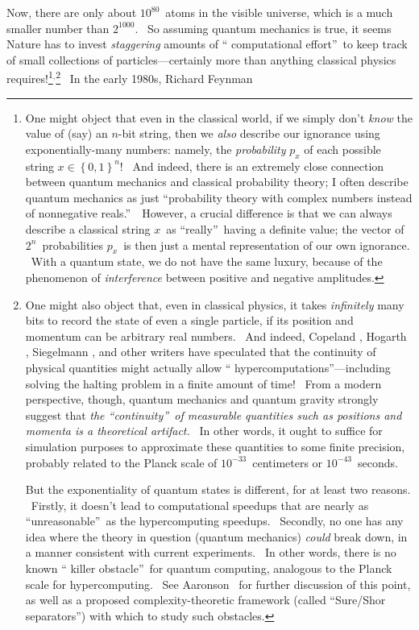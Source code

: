 \documentclass[11pt,onecolumn]{article}%
\begin{document}
Now, there are only about $10^{80}$\ atoms in the visible universe, which is a
much smaller number than $2^{1000}$. \ So assuming quantum mechanics is true,
it seems Nature has to invest \textit{staggering} amounts of \textquotedblleft
computational effort\textquotedblright\ to keep track of small collections of
particles---certainly more than anything classical physics
requires!\footnote{One might object that even in the classical world, if we
simply don't \textit{know} the value of (say) an $n$-bit string, then we
\textit{also} describe our ignorance using exponentially-many numbers: namely,
the \textit{probability} $p_{x}$ of each possible string $x\in\left\{
0,1\right\}  ^{n}$! \ And indeed, there is an extremely close connection
between quantum mechanics and classical probability theory; I often describe
quantum mechanics as just \textquotedblleft probability theory with complex
numbers instead of nonnegative reals.\textquotedblright\ \ However, a crucial
difference is that we can always describe a classical string $x$\ as
\textquotedblleft really\textquotedblright\ having a definite value; the
vector of $2^{n}$\ probabilities $p_{x}$\ is then just a mental representation
of our own ignorance. \ With a quantum state, we do not have the same luxury,
because of the phenomenon of \textit{interference} between positive and
negative amplitudes.}$^{,}$\footnote{One might also object that, even in
classical physics, it takes \textit{infinitely} many bits to record the state
of even a single particle, if its position and momentum can be arbitrary real
numbers. \ And indeed, Copeland \cite{copeland}, Hogarth \cite{hogarth},
Siegelmann \cite{siegelmann}, and other writers have speculated that the
continuity of physical quantities might actually allow \textquotedblleft
hypercomputations\textquotedblright---including solving the halting problem in
a finite amount of time! \ From a modern perspective, though, quantum
mechanics and quantum gravity strongly suggest that \textit{the
\textquotedblleft continuity\textquotedblright\ of measurable quantities such
as positions and momenta is a theoretical artifact.} \ In other words, it
ought to suffice for simulation purposes to approximate these quantities to
some finite precision, probably related to the Planck scale of $10^{-33}%
$\ centimeters or $10^{-43}$\ seconds.
\par
But the exponentiality of quantum states is different, for at least two
reasons. \ Firstly, it doesn't lead to computational speedups that are nearly
as \textquotedblleft unreasonable\textquotedblright\ as the hypercomputing
speedups. \ Secondly, no one has any idea where the theory in question
(quantum mechanics) \textit{could} break down, in a manner consistent with
current experiments. \ In other words, there is no known \textquotedblleft
killer obstacle\textquotedblright\ for quantum computing, analogous to the
Planck scale for hypercomputing. \ See Aaronson \cite{aar:mlin}\ for further
discussion of this point, as well as a proposed complexity-theoretic framework
(called \textquotedblleft Sure/Shor separators\textquotedblright) with which
to study such obstacles.} \ In the early 1980s, Richard Feynman
\end{document}
